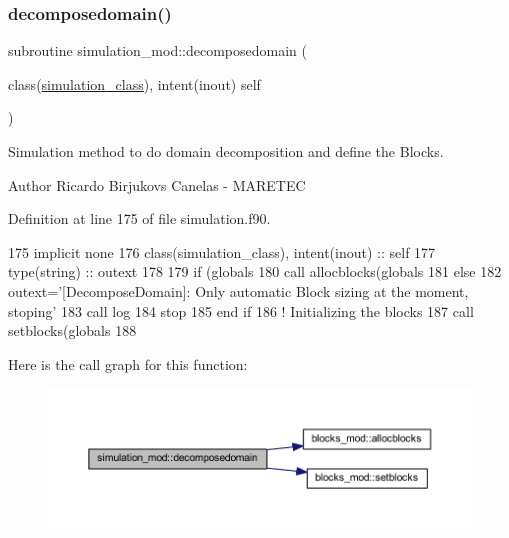 \subsubsection{\texorpdfstring{decomposedomain()}{decomposedomain()}}
{\footnotesize\ttfamily subroutine simulation\+\_\+mod\+::decomposedomain (\begin{DoxyParamCaption}\item[{class(\mbox{\hyperlink{structsimulation__mod_1_1simulation__class}{simulation\+\_\+class}}), intent(inout)}]{self }\end{DoxyParamCaption})\hspace{0.3cm}{\ttfamily [private]}}



Simulation method to do domain decomposition and define the Blocks. 

\begin{DoxyAuthor}{Author}
Ricardo Birjukovs Canelas -\/ M\+A\+R\+E\+T\+EC 
\end{DoxyAuthor}


Definition at line 175 of file simulation.\+f90.


\begin{DoxyCode}
175     \textcolor{keywordtype}{implicit none}
176     \textcolor{keywordtype}{class}(simulation\_class), \textcolor{keywordtype}{intent(inout)} :: self
177     \textcolor{keywordtype}{type}(string) :: outext
178 
179     \textcolor{keywordflow}{if} (globals%
180         \textcolor{keyword}{call }allocblocks(globals%
181     \textcolor{keywordflow}{else}
182         outext=\textcolor{stringliteral}{'[DecomposeDomain]: Only automatic Block sizing at the moment, stoping'}
183         \textcolor{keyword}{call }log%
184         stop
185 \textcolor{keywordflow}{    end if}
186     \textcolor{comment}{! Initializing the blocks}
187     \textcolor{keyword}{call }setblocks(globals%
188 
\end{DoxyCode}
Here is the call graph for this function\+:\nopagebreak
\begin{figure}[H]
\begin{center}
\leavevmode
\includegraphics[width=350pt]{namespacesimulation__mod_a2b8198a9fb3f7671c6b45192a0b9740c_cgraph}
\end{center}
\end{figure}
\mbox{\label{namespacesimulation__mod_a726a2e98adc73c762cafd7baa88f58fd}} 
